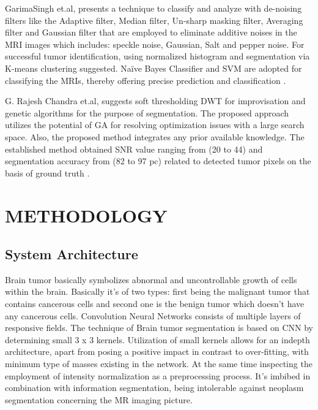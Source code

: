 \documentclass[a4paper, 12pt]{report}
\begin{document}
\begin{spacing}{1.5}
\par GarimaSingh et.al, presents a technique to classify and analyze with de-noising filters like the Adaptive filter, Median filter, Un-sharp masking filter, Averaging filter and Gaussian filter that are employed to eliminate additive noises in the MRI images which includes: speckle noise, Gaussian, Salt and pepper noise. For successful tumor identification, using normalized histogram and segmentation via K-means clustering suggested. Naïve Bayes Classifier and SVM are adopted for classifying the MRIs, thereby offering precise prediction and classification \cite{gari}.

\par G. Rajesh Chandra et.al, suggests soft thresholding DWT for improvisation and genetic
algorithms for the purpose of segmentation. The proposed approach utilizes the potential of GA for resolving
optimization issues with a large search space. Also, the proposed method integrates any prior available knowledge. The established method obtained SNR value ranging from (20 to 44) and segmentation accuracy from (82 to 97 pc) related to detected tumor pixels on the basis of ground truth \cite{grc}.

\chapter{METHODOLOGY}

\section{System Architecture}

\par Brain tumor basically symbolizes abnormal and uncontrollable growth of cells within the brain. Basically it’s of two types: first being the malignant tumor that contains cancerous cells and second one is the benign tumor which doesn’t have any cancerous cells. Convolution Neural Networks consists of multiple layers of responsive fields. The technique of Brain tumor segmentation is based on CNN by determining small 3 x 3 kernels. Utilization of small kernels allows for an indepth architecture, apart from posing a positive impact in contrast to over-fitting, with minimum type of masses existing in the network. At the same time inspecting the employment of intensity normalization as a preprocessing process. It’s imbibed in combination with information segmentation, being intolerable against neoplasm segmentation concerning the MR imaging picture.\\


\end{spacing}
\end{document}

